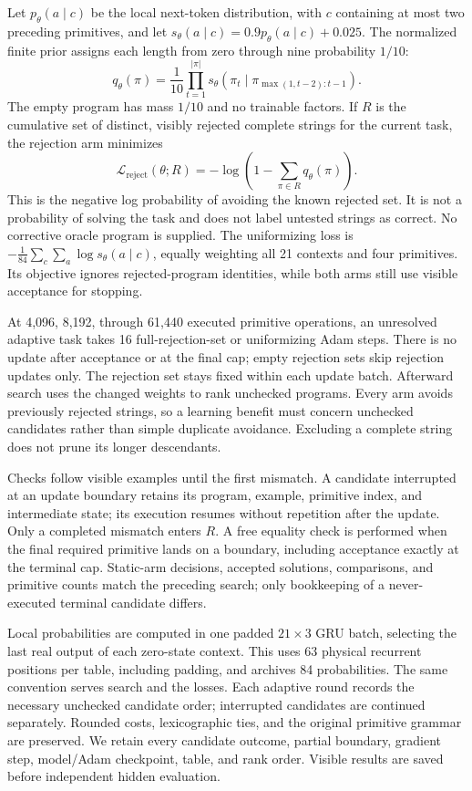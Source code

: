 \documentclass[11pt]{article}
\begin{document}
Let $p_\theta(a\mid c)$ be the local next-token distribution, with
$c$ containing at most two preceding primitives, and let
$s_\theta(a\mid c)=0.9p_\theta(a\mid c)+0.025$. The normalized finite prior
assigns each length from zero through nine probability $1/10$:
\[
q_\theta(\pi)=\frac{1}{10}\prod_{t=1}^{|\pi|}
 s_\theta(\pi_t\mid\pi_{\max(1,t-2):t-1}).
\]
The empty program has mass $1/10$ and no trainable factors. If $R$ is the
cumulative set of distinct, visibly rejected complete strings for the current
task, the rejection arm minimizes
\[
\mathcal{L}_{\mathrm{reject}}(\theta;R)
=-\log\left(1-\sum_{\pi\in R}q_\theta(\pi)\right).
\]
This is the negative log probability of avoiding the known rejected set. It
is not a probability of solving the task and does not label untested strings
as correct. No corrective oracle program is supplied. The uniformizing loss
is $-\frac{1}{84}\sum_c\sum_a\log s_\theta(a\mid c)$, equally weighting
all 21 contexts and four primitives. Its objective ignores rejected-program
identities, while both arms still use visible acceptance for stopping.

At 4,096, 8,192, through 61,440 executed primitive operations, an unresolved
adaptive task takes 16 full-rejection-set or uniformizing Adam steps. There
is no update after acceptance or at the final cap; empty rejection sets skip
rejection updates only. The rejection set stays fixed within each update batch.
Afterward search uses the changed weights to rank unchecked programs. Every
arm avoids previously rejected strings, so a learning benefit must concern
unchecked candidates rather than simple duplicate avoidance. Excluding a
complete string does not prune its longer descendants.

Checks follow visible examples until the first mismatch. A candidate
interrupted at an update boundary retains its program, example, primitive
index, and intermediate state; its execution resumes without repetition after
the update. Only a completed mismatch enters $R$. A free equality check is
performed when the final required primitive lands on a boundary, including
acceptance exactly at the terminal cap. Static-arm decisions, accepted
solutions, comparisons, and primitive counts match the preceding search;
only bookkeeping of a never-executed terminal candidate differs.

Local probabilities are computed in one padded $21\times3$ GRU batch,
selecting the last real output of each zero-state context. This uses 63
physical recurrent positions per table, including padding, and archives 84
probabilities. The same convention serves search and the losses. Each
adaptive round records the necessary unchecked candidate order; interrupted
candidates are continued separately. Rounded costs, lexicographic ties, and
the original primitive grammar are preserved. We retain every candidate
outcome, partial boundary, gradient step, model/Adam checkpoint, table, and
rank order. Visible results are saved before independent hidden evaluation.
\end{document}
